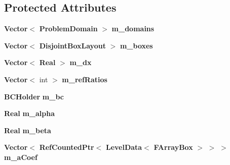 \subsection*{Protected Attributes}
\begin{DoxyCompactItemize}
\item 
\mbox{\label{class_a_m_r_scalar_diffusion_op_factory_a3a7ab514267373eb8449d07733862404}} 
\textbf{ Vector}$<$ \textbf{ Problem\+Domain} $>$ {\bfseries m\+\_\+domains}
\item 
\mbox{\label{class_a_m_r_scalar_diffusion_op_factory_a577bf97215086239c91bbc74213db2ef}} 
\textbf{ Vector}$<$ \textbf{ Disjoint\+Box\+Layout} $>$ {\bfseries m\+\_\+boxes}
\item 
\mbox{\label{class_a_m_r_scalar_diffusion_op_factory_a9823f59f2247c301a7b826a2514e8052}} 
\textbf{ Vector}$<$ \textbf{ Real} $>$ {\bfseries m\+\_\+dx}
\item 
\mbox{\label{class_a_m_r_scalar_diffusion_op_factory_a0285e29226062d991e3f4e585b734adb}} 
\textbf{ Vector}$<$ int $>$ {\bfseries m\+\_\+ref\+Ratios}
\item 
\mbox{\label{class_a_m_r_scalar_diffusion_op_factory_a0e6a52fbe21d5ddddd68fefbfaf86e08}} 
\textbf{ B\+C\+Holder} {\bfseries m\+\_\+bc}
\item 
\mbox{\label{class_a_m_r_scalar_diffusion_op_factory_a7574e45991fb4e25c40de6a9fb8ceae2}} 
\textbf{ Real} {\bfseries m\+\_\+alpha}
\item 
\mbox{\label{class_a_m_r_scalar_diffusion_op_factory_aae56765c746ff3712dfad25e5a41148c}} 
\textbf{ Real} {\bfseries m\+\_\+beta}
\item 
\mbox{\label{class_a_m_r_scalar_diffusion_op_factory_a52dc095fbaab002edb522f7d793e725e}} 
\textbf{ Vector}$<$ \textbf{ Ref\+Counted\+Ptr}$<$ \textbf{ Level\+Data}$<$ \textbf{ F\+Array\+Box} $>$ $>$ $>$ {\bfseries m\+\_\+a\+Coef}
\item 

\end{DoxyCompactItemize}
